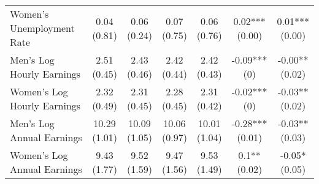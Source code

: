 \begin{ThreePartTable}
\begin{longtable}[t]{>{\raggedright\arraybackslash}p{5cm}cccccc}
\addlinespace
\hspace{1em}Women's Unemployment Rate & \specialcell{0.04\\(0.81)} & \specialcell{0.06\\(0.24)} & \specialcell{0.07\\(0.75)} & \specialcell{0.06\\(0.76)} & \specialcell{0.02***\\(0.00)} & \specialcell{0.01***\\(0.00)}\\
\hspace{1em}Men's Log Hourly Earnings & \specialcell{2.51\\(0.45)} & \specialcell{2.43\\(0.46)} & \specialcell{2.42\\(0.44)} & \specialcell{2.42\\(0.43)} & \specialcell{-0.09***\\(0)} & \specialcell{-0.00**\\(0.02)}\\
\hspace{1em}Women's Log Hourly Earnings & \specialcell{2.32\\(0.49)} & \specialcell{2.31\\(0.45)} & \specialcell{2.28\\(0.45)} & \specialcell{2.31\\(0.42)} & \specialcell{-0.02***\\(0)} & \specialcell{-0.03**\\(0.02)}\\
\hspace{1em}Men's Log Annual Earnings & \specialcell{10.29\\(1.01)} & \specialcell{10.09\\(1.05)} & \specialcell{10.06\\(0.97)} & \specialcell{10.01\\(1.04)} & \specialcell{-0.28***\\(0.01)} & \specialcell{-0.03**\\(0.03)}\\
\hspace{1em}Women's Log Annual Earnings & \specialcell{9.43\\(1.77)} & \specialcell{9.52\\(1.59)} & \specialcell{9.47\\(1.56)} & \specialcell{9.53\\(1.49)} & \specialcell{0.1**\\(0.02)} & \specialcell{-0.05*\\(0.05)}\\*
\end{longtable}
\end{ThreePartTable}
